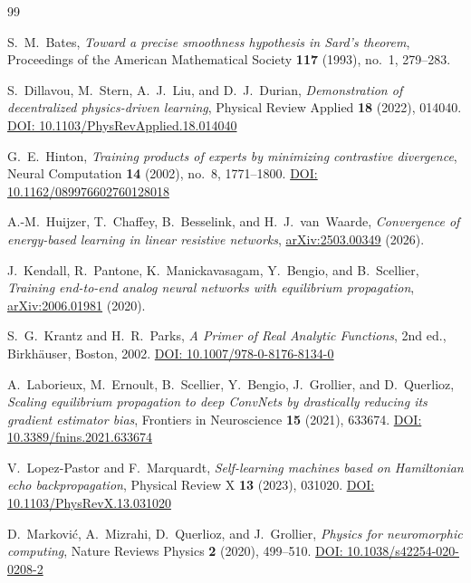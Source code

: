 \documentclass{siamart}
\begin{document}
\begin{thebibliography}{99}

S.~M.~Bates,
\textit{Toward a precise smoothness hypothesis in {S}ard's theorem},
Proceedings of the American Mathematical Society \textbf{117} (1993), no.~1, 279--283.

S.~Dillavou, M.~Stern, A.~J.~Liu, and D.~J.~Durian,
\textit{Demonstration of decentralized physics-driven learning},
Physical Review Applied \textbf{18} (2022), 014040.
\href{https://doi.org/10.1103/PhysRevApplied.18.014040}{DOI: 10.1103/PhysRevApplied.18.014040}

G.~E.~Hinton,
\textit{Training products of experts by minimizing contrastive divergence},
Neural Computation \textbf{14} (2002), no.~8, 1771--1800.
\href{https://doi.org/10.1162/089976602760128018}{DOI: 10.1162/089976602760128018}

A.-M.~Huijzer, T.~Chaffey, B.~Besselink, and H.~J.~van~Waarde,
\textit{Convergence of energy-based learning in linear resistive networks},
\href{https://arxiv.org/abs/2503.00349}{arXiv:2503.00349} (2026).

J.~Kendall, R.~Pantone, K.~Manickavasagam, Y.~Bengio, and B.~Scellier,
\textit{Training end-to-end analog neural networks with equilibrium propagation},
\href{https://arxiv.org/abs/2006.01981}{arXiv:2006.01981} (2020).

S.~G.~Krantz and H.~R.~Parks,
\textit{A Primer of Real Analytic Functions}, 2nd ed.,
Birkh\"{a}user, Boston, 2002.
\href{https://doi.org/10.1007/978-0-8176-8134-0}{DOI: 10.1007/978-0-8176-8134-0}

A.~Laborieux, M.~Ernoult, B.~Scellier, Y.~Bengio, J.~Grollier, and D.~Querlioz,
\textit{Scaling equilibrium propagation to deep {C}onv{N}ets by drastically reducing its gradient estimator bias},
Frontiers in Neuroscience \textbf{15} (2021), 633674.
\href{https://doi.org/10.3389/fnins.2021.633674}{DOI: 10.3389/fnins.2021.633674}

V.~Lopez-Pastor and F.~Marquardt,
\textit{Self-learning machines based on {H}amiltonian echo backpropagation},
Physical Review X \textbf{13} (2023), 031020.
\href{https://doi.org/10.1103/PhysRevX.13.031020}{DOI: 10.1103/PhysRevX.13.031020}

D.~Markovi\'{c}, A.~Mizrahi, D.~Querlioz, and J.~Grollier,
\textit{Physics for neuromorphic computing},
Nature Reviews Physics \textbf{2} (2020), 499--510.
\href{https://doi.org/10.1038/s42254-020-0208-2}{DOI: 10.1038/s42254-020-0208-2}


\end{thebibliography}
\end{document}
